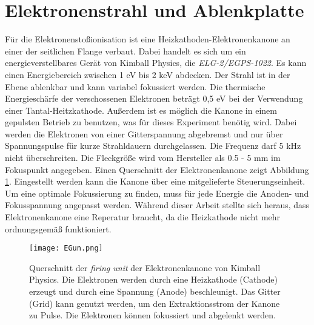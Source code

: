 \section{Elektronenstrahl und Ablenkplatte}
Für die Elektronenstoßionisation ist eine Heizkathoden-Elektronenkanone an einer der seitlichen Flange verbaut. Dabei handelt es sich um ein energieverstellbares Gerät von Kimball Physics, die \textit{ELG-2/EGPS-1022}. Es kann einen Energiebereich zwischen 1 eV bis 2 keV abdecken. Der Strahl ist in der Ebene ablenkbar und kann variabel fokussiert werden. Die thermische Energieschärfe der verschossenen Elektronen beträgt 0,5 eV bei der Verwendung einer Tantal-Heitzkathode. Außerdem ist es möglich die Kanone in einem gepulsten Betrieb zu benutzen, was für dieses Experiment benötig wird. Dabei werden die Elektronen von einer Gitterspannung abgebremst und nur über Spannungspulse für kurze Strahldauern durchgelassen. Die Frequenz darf 5 kHz nicht überschreiten. Die Fleckgröße wird vom Hersteller als 0.5 - 5 mm im Fokuspunkt angegeben. Einen Querschnitt der Elektronenkanone zeigt Abbildung \ref{fig:EGun}. Eingestellt werden kann die Kanone über eine mitgelieferte Steuerungseinheit. Um eine optimale Fokussierung zu finden, muss für jede Energie die Anoden- und Fokusspannung angepasst werden. Während dieser Arbeit stellte sich heraus, dass Elektronenkanone eine Reperatur braucht, da die Heizkathode nicht mehr ordnungsgemäß funktioniert.

\begin{figure}
    \centering
    \texttt{[image: EGun.png]}
    \caption[Querschnitt der \textit{firing unit} der Elektronenkanone]{Querschnitt der \textit{firing unit} der Elektronenkanone von Kimball Physics. Die Elektronen werden durch eine Heizkathode (Cathode) erzeugt und durch eine Spannung (Anode) beschleunigt. Das Gitter (Grid) kann genutzt werden, um den Extraktionsstrom der Kanone zu Pulse. Die Elektronen können fokussiert und abgelenkt werden.}
    \label{fig:EGun}
\end{figure}

